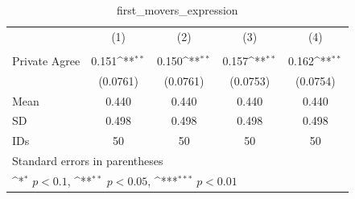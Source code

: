 \begin{table}[htbp]\centering
\def\sym#1{\ifmmode^{#1}\else\(^{#1}\)\fi}
\caption{first\_movers\_expression}
\begin{tabular}{l*{4}{c}}
\hline\hline
                                &\multicolumn{1}{c}{(1)}&\multicolumn{1}{c}{(2)}&\multicolumn{1}{c}{(3)}&\multicolumn{1}{c}{(4)}\\
                                &\multicolumn{1}{c}{}&\multicolumn{1}{c}{}&\multicolumn{1}{c}{}&\multicolumn{1}{c}{}\\
\hline
Private Agree                   &    0.151\sym{**} &    0.150\sym{**} &    0.157\sym{**} &    0.162\sym{**} \\
                                & (0.0761)         & (0.0761)         & (0.0753)         & (0.0754)         \\
\hline
Mean                            &    0.440         &    0.440         &    0.440         &    0.440         \\
SD                              &    0.498         &    0.498         &    0.498         &    0.498         \\
IDs                             &       50         &       50         &       50         &       50         \\
\hline\hline
\multicolumn{5}{l}{\footnotesize Standard errors in parentheses}\\
\multicolumn{5}{l}{\footnotesize \sym{*} \(p<0.1\), \sym{**} \(p<0.05\), \sym{***} \(p<0.01\)}\\
\end{tabular}
\end{table}
